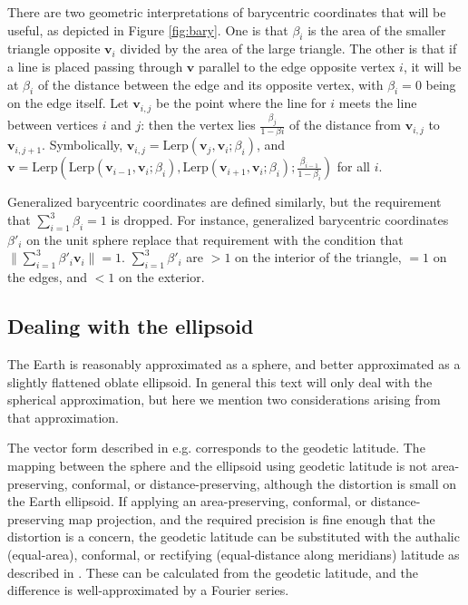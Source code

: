 \documentclass{amsart}[12pt]
\begin{document}
There are two geometric interpretations of barycentric coordinates that will be
useful, as depicted in Figure \ref{fig:bary}. One is that $\beta_i$ is the area
of the smaller triangle opposite $\mathbf v_i$ divided by the area of the large
triangle.
The other is that if a line is placed passing through $\mathbf v$ parallel to
the edge opposite vertex $i$, it will be at $\beta_i$ of the distance between
the edge and its opposite vertex, with $\beta_i = 0$ being on the edge itself.
Let $\mathbf v_{i,j}$ be the point where the line for $i$ meets the line between
vertices $i$ and $j$: then the vertex lies $\frac{\beta_{j}}{1-\beta{i}}$
of the distance from $\mathbf v_{i,j}$ to $\mathbf v_{i,j+1}$. Symbolically,
$\mathbf v_{i,j} = \mathrm{Lerp}(\mathbf v_{j},\mathbf v_i;\beta_{i})$, and
$\mathbf v = \mathrm{Lerp}(\mathrm{Lerp}(\mathbf v_{i-1}, \mathbf v_i;
\beta_{i}), \mathrm{Lerp}(\mathbf v_{i+1}, \mathbf v_i; \beta_{i});
\frac{\beta_{i-1}}{1-\beta_{i}})$ for all $i$.

Generalized barycentric coordinates are defined similarly, but the requirement
that $\sum^3_{i=1} \beta_i = 1$ is dropped. For instance, generalized
barycentric coordinates $\beta'_i$ on the unit sphere replace that requirement
with the condition that $\| \sum^3_{i=1} \beta'_i \mathbf v_i \| = 1$.
$\sum^3_{i=1} \beta'_i$ are $>1$ on the interior of the triangle,
$=1$ on the edges, and $<1$ on the exterior.

\subsection{Dealing with the ellipsoid}
The Earth is reasonably approximated as a sphere, and better approximated as a
slightly flattened oblate ellipsoid. In general this text will only deal with
the spherical approximation, but here we mention two considerations arising
from that approximation.

The vector form described in e.g. \cite{strang12} corresponds to the geodetic latitude.
The mapping between the sphere and the ellipsoid using geodetic latitude is not
area-preserving, conformal, or distance-preserving, although the distortion is
small on the Earth ellipsoid. If applying an area-preserving, conformal, or
distance-preserving map projection, and the required precision is fine enough
that the distortion is a concern, the geodetic latitude can be substituted
with the authalic (equal-area), conformal, or rectifying
(equal-distance along meridians) latitude as described in \cite{snyder87}.
These can be calculated from the geodetic latitude,
and the difference is well-approximated by a Fourier series.
\end{document}
